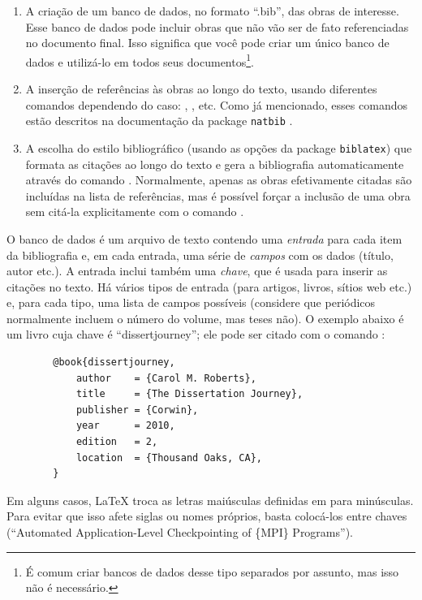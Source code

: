 \begin{enumerate}
\item A criação de um banco de dados, no formato ``.bib'', das obras de
interesse. Esse banco de dados pode incluir obras que não vão ser de fato
referenciadas no documento final. Isso significa que você pode criar um
único banco de dados e utilizá-lo em todos seus documentos\footnote{É
comum criar bancos de dados desse tipo separados por assunto, mas isso
não é necessário.}.

\item A inserção de referências às obras ao longo do texto, usando
diferentes comandos dependendo do caso: , ,
 etc. Como já mencionado, esses comandos estão descritos
na documentação da package \texttt{natbib} \citep{natbib}.

\item A escolha do estilo bibliográfico (usando as opções da package
\texttt{biblatex}) que formata as citações ao longo do texto e gera a bibliografia
automaticamente através do comando . Normalmente,
apenas as obras efetivamente citadas são incluídas na lista de referências,
mas é possível forçar a inclusão de uma obra sem citá-la explicitamente com
o comando .
\end{enumerate}

O banco de dados é um arquivo de texto contendo uma \emph{entrada} para cada
item da bibliografia e, em cada entrada, uma série de \emph{campos} com os
dados (título, autor etc.). A entrada inclui também uma \emph{chave}, que é
usada para inserir as citações no texto. Há vários tipos de entrada (para
artigos, livros, sítios web etc.) e, para cada tipo, uma lista de campos
possíveis (considere que periódicos normalmente incluem o número do volume,
mas teses não). O exemplo abaixo é um livro cuja chave é ``dissertjourney'';
ele pode ser citado com o comando :

\begin{verbatim}
        @book{dissertjourney,
            author    = {Carol M. Roberts},
            title     = {The Dissertation Journey},
            publisher = {Corwin},
            year      = 2010,
            edition   = 2,
            location  = {Thousand Oaks, CA},
        }

\end{verbatim}

Em alguns casos, \LaTeX{} troca as letras maiúsculas definidas em
 para minúsculas. Para evitar que isso afete siglas
ou nomes próprios, basta colocá-los entre chaves (``Automated
Application-Level Checkpointing of \{MPI\} Programs'').

